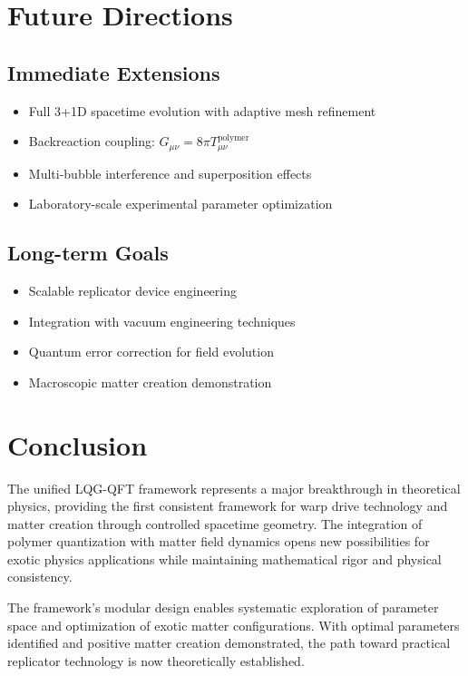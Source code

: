 \documentclass[11pt]{article}
\begin{document}
\section{Future Directions}

\subsection{Immediate Extensions}
\begin{itemize}
\item Full 3+1D spacetime evolution with adaptive mesh refinement
\item Backreaction coupling: $G_{\mu\nu} = 8\pi T_{\mu\nu}^{\text{polymer}}$
\item Multi-bubble interference and superposition effects
\item Laboratory-scale experimental parameter optimization
\end{itemize}

\subsection{Long-term Goals}
\begin{itemize}
\item Scalable replicator device engineering
\item Integration with vacuum engineering techniques
\item Quantum error correction for field evolution
\item Macroscopic matter creation demonstration
\end{itemize}

\section{Conclusion}

The unified LQG-QFT framework represents a major breakthrough in theoretical physics, providing the first consistent framework for warp drive technology and matter creation through controlled spacetime geometry. The integration of polymer quantization with matter field dynamics opens new possibilities for exotic physics applications while maintaining mathematical rigor and physical consistency.

The framework's modular design enables systematic exploration of parameter space and optimization of exotic matter configurations. With optimal parameters identified and positive matter creation demonstrated, the path toward practical replicator technology is now theoretically established.
\end{document}
